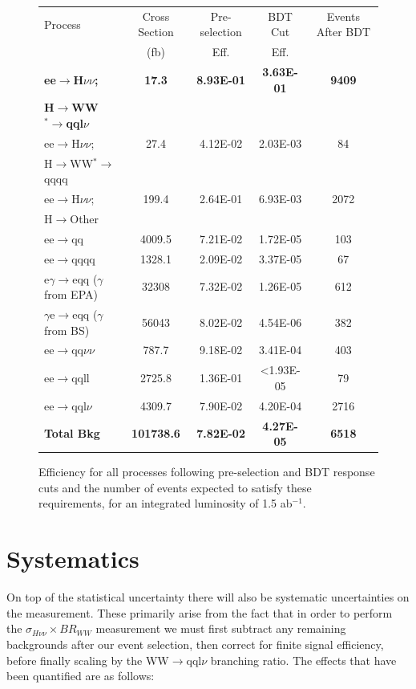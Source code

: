 \begin{figure}
  \centering
  \begin{tabular}{l c c c c}
   \toprule
    Process & Cross Section & Pre-selection & BDT Cut  & Events After BDT     \\
    & (fb) & Eff. & Eff. &      \\
    \midrule
    \midrule
    \bf{ee$\rightarrow$H$\nu\nu$;}            & \bf{17.3}    &  \bf{8.93E-01}  & \bf{3.63E-01} & \bf{9409}    \\
    \bf{H$\rightarrow$WW$^*\rightarrow$qql$\nu$} & & & & \\
    \midrule
    \midrule
    ee$\rightarrow$H$\nu\nu$;  & 27.4    & 4.12E-02 & 2.03E-03 & 84  \\
    H$\rightarrow$WW$^*\rightarrow$qqqq & & & & \\
    ee$\rightarrow$H$\nu\nu$; & 199.4 & 2.64E-01 & 6.93E-03 & 2072 \\
    H$\rightarrow$Other & & & & \\
    \midrule
    \midrule
    ee$\rightarrow$qq               & 4009.5    & 7.21E-02 &  1.72E-05 & 103  \\ 
    ee$\rightarrow$qqqq               & 1328.1    &  2.09E-02 & 3.37E-05 & 67   \\ 
    e$\gamma$$\rightarrow$eqq ($\gamma$ from EPA)                 & 32308    & 7.32E-02  & 1.26E-05 & 612  \\ 
    $\gamma$e$\rightarrow$eqq ($\gamma$ from BS)               &  56043   & 8.02E-02 & 4.54E-06 & 382  \\ 
    ee$\rightarrow$qq$\nu\nu$               & 787.7    & 9.18E-02 & 3.41E-04 & 403   \\ 
    ee$\rightarrow$qqll               & 2725.8    & 1.36E-01  & <1.93E-05 & 79    \\ 
    ee$\rightarrow$qql$\nu$              & 4309.7    & 7.90E-02  & 4.20E-04 & 2716    \\ 
    \midrule
    \midrule
    \bf{Total Bkg}                    & \bf{101738.6} & \bf{7.82E-02} & \bf{4.27E-05} & \bf{6518} \\
    \midrule
    \bottomrule
  \end{tabular}
  \caption[Samples Used]{Efficiency for all processes following pre-selection and BDT response cuts and the number of events expected to satisfy these requirements, for an integrated luminosity of 1.5 ab$^{-1}$.}
  \label{cuts}
\end{figure}

\section{Systematics}
\label{higgsSystematics}
On top of the statistical uncertainty there will also be systematic uncertainties on the measurement. These primarily arise from the fact that in order to perform the $\sigma_{H\nu\nu}\times BR_{WW}$ measurement we must first subtract any remaining backgrounds after our event selection, then correct for finite signal efficiency, before finally scaling by the WW$\rightarrow$qql$\nu$ branching ratio. The  effects that have been quantified  are as follows:

